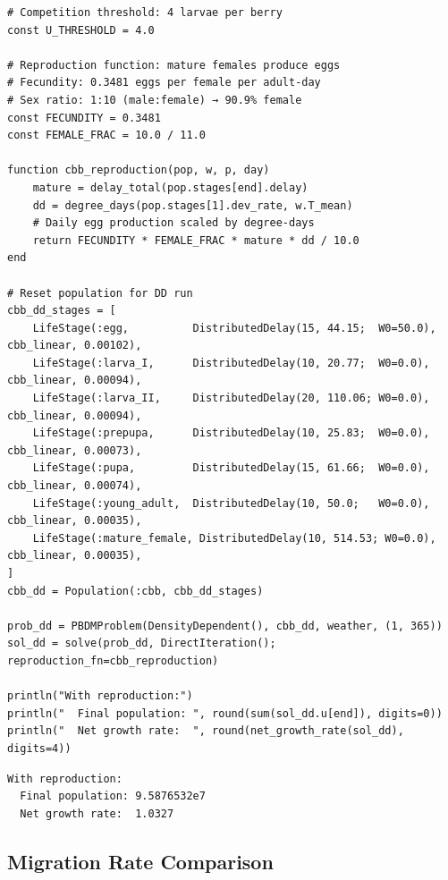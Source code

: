 \begin{verbatim}
# Competition threshold: 4 larvae per berry
const U_THRESHOLD = 4.0

# Reproduction function: mature females produce eggs
# Fecundity: 0.3481 eggs per female per adult-day
# Sex ratio: 1:10 (male:female) → 90.9% female
const FECUNDITY = 0.3481
const FEMALE_FRAC = 10.0 / 11.0

function cbb_reproduction(pop, w, p, day)
    mature = delay_total(pop.stages[end].delay)
    dd = degree_days(pop.stages[1].dev_rate, w.T_mean)
    # Daily egg production scaled by degree-days
    return FECUNDITY * FEMALE_FRAC * mature * dd / 10.0
end

# Reset population for DD run
cbb_dd_stages = [
    LifeStage(:egg,          DistributedDelay(15, 44.15;  W0=50.0),  cbb_linear, 0.00102),
    LifeStage(:larva_I,      DistributedDelay(10, 20.77;  W0=0.0),   cbb_linear, 0.00094),
    LifeStage(:larva_II,     DistributedDelay(20, 110.06; W0=0.0),   cbb_linear, 0.00094),
    LifeStage(:prepupa,      DistributedDelay(10, 25.83;  W0=0.0),   cbb_linear, 0.00073),
    LifeStage(:pupa,         DistributedDelay(15, 61.66;  W0=0.0),   cbb_linear, 0.00074),
    LifeStage(:young_adult,  DistributedDelay(10, 50.0;   W0=0.0),   cbb_linear, 0.00035),
    LifeStage(:mature_female, DistributedDelay(10, 514.53; W0=0.0),  cbb_linear, 0.00035),
]
cbb_dd = Population(:cbb, cbb_dd_stages)

prob_dd = PBDMProblem(DensityDependent(), cbb_dd, weather, (1, 365))
sol_dd = solve(prob_dd, DirectIteration(); reproduction_fn=cbb_reproduction)

println("With reproduction:")
println("  Final population: ", round(sum(sol_dd.u[end]), digits=0))
println("  Net growth rate:  ", round(net_growth_rate(sol_dd), digits=4))
\end{verbatim}




\begin{verbatim}
With reproduction:
  Final population: 9.5876532e7
  Net growth rate:  1.0327
\end{verbatim}



\subsection{Migration Rate Comparison}



\label{9053411023210957152}{}


